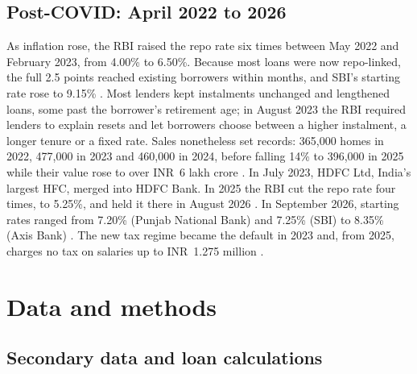 \documentclass[sn-basic]{sn-jnl}
\newcommand{\INR}{INR~}
\begin{document}
\subsection{Post-COVID: April 2022 to 2026}

As inflation rose, the RBI raised the repo rate six times between May 2022 and February 2023, from 4.00\% to 6.50\%. Because most loans were now repo-linked, the full 2.5 points reached existing borrowers within months, and SBI's starting rate rose to 9.15\% \citep{navi2023}. Most lenders kept instalments unchanged and lengthened loans, some past the borrower's retirement age; in August 2023 the RBI required lenders to explain resets and let borrowers choose between a higher instalment, a longer tenure or a fixed rate. Sales nonetheless set records: 365,000 homes in 2022, 477,000 in 2023 and 460,000 in 2024, before falling 14\% to 396,000 in 2025 while their value rose to over \INR 6 lakh crore \citep{anarock2022,tribune2024,mediabrief2025}. In July 2023, HDFC Ltd, India's largest HFC, merged into HDFC Bank. In 2025 the RBI cut the repo rate four times, to 5.25\%, and held it there in August 2026 \citep{iifl2026repo}. In September 2026, starting rates ranged from 7.20\% (Punjab National Bank) and 7.25\% (SBI) to 8.35\% (Axis Bank) \citep{urbanmoney2026}. The new tax regime became the default in 2023 and, from 2025, charges no tax on salaries up to \INR 1.275 million \citep{cleartaxslabs}.

\section{Data and methods}\label{sec:methods}

\subsection{Secondary data and loan calculations}
\end{document}
